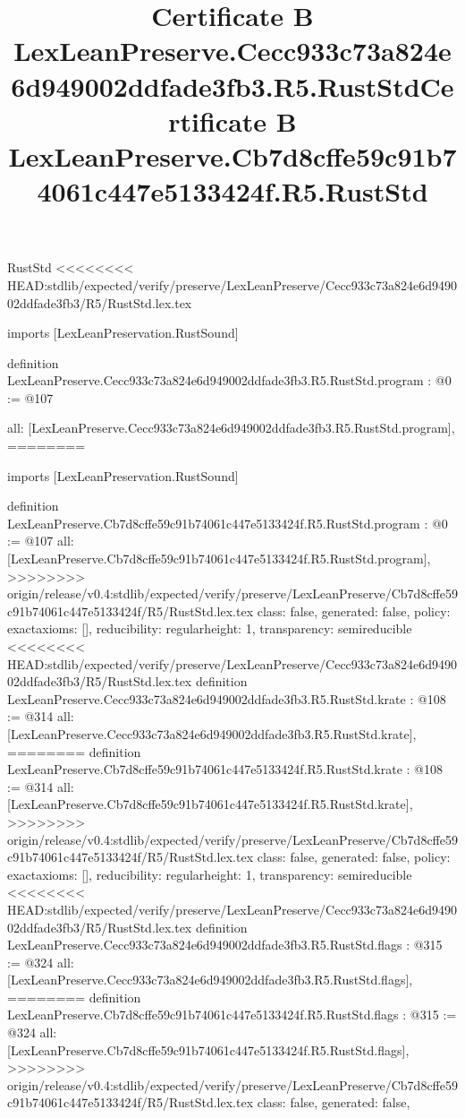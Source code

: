 \begin{lexlean}{RustStd}
<<<<<<<< HEAD:stdlib/expected/verify/preserve/LexLeanPreserve/Cecc933c73a824e6d949002ddfade3fb3/R5/RustStd.lex.tex
\title{Certificate B LexLeanPreserve.Cecc933c73a824e6d949002ddfade3fb3.R5.RustStd}
\begin{coremodule}
imports [LexLeanPreservation.RustSound]

definition LexLeanPreserve.Cecc933c73a824e6d949002ddfade3fb3.R5.RustStd.program : @0 := @107 {
  all: [LexLeanPreserve.Cecc933c73a824e6d949002ddfade3fb3.R5.RustStd.program],
========
\title{Certificate B LexLeanPreserve.Cb7d8cffe59c91b74061c447e5133424f.R5.RustStd}
\begin{coremodule}
imports [LexLeanPreservation.RustSound]

definition LexLeanPreserve.Cb7d8cffe59c91b74061c447e5133424f.R5.RustStd.program : @0 := @107 {
  all: [LexLeanPreserve.Cb7d8cffe59c91b74061c447e5133424f.R5.RustStd.program],
>>>>>>>> origin/release/v0.4:stdlib/expected/verify/preserve/LexLeanPreserve/Cb7d8cffe59c91b74061c447e5133424f/R5/RustStd.lex.tex
  class: false,
  generated: false,
  policy: exact{axioms: []},
  reducibility: regular{height: 1},
  transparency: semireducible
}
<<<<<<<< HEAD:stdlib/expected/verify/preserve/LexLeanPreserve/Cecc933c73a824e6d949002ddfade3fb3/R5/RustStd.lex.tex
definition LexLeanPreserve.Cecc933c73a824e6d949002ddfade3fb3.R5.RustStd.krate : @108 := @314 {
  all: [LexLeanPreserve.Cecc933c73a824e6d949002ddfade3fb3.R5.RustStd.krate],
========
definition LexLeanPreserve.Cb7d8cffe59c91b74061c447e5133424f.R5.RustStd.krate : @108 := @314 {
  all: [LexLeanPreserve.Cb7d8cffe59c91b74061c447e5133424f.R5.RustStd.krate],
>>>>>>>> origin/release/v0.4:stdlib/expected/verify/preserve/LexLeanPreserve/Cb7d8cffe59c91b74061c447e5133424f/R5/RustStd.lex.tex
  class: false,
  generated: false,
  policy: exact{axioms: []},
  reducibility: regular{height: 1},
  transparency: semireducible
}
<<<<<<<< HEAD:stdlib/expected/verify/preserve/LexLeanPreserve/Cecc933c73a824e6d949002ddfade3fb3/R5/RustStd.lex.tex
definition LexLeanPreserve.Cecc933c73a824e6d949002ddfade3fb3.R5.RustStd.flags : @315 := @324 {
  all: [LexLeanPreserve.Cecc933c73a824e6d949002ddfade3fb3.R5.RustStd.flags],
========
definition LexLeanPreserve.Cb7d8cffe59c91b74061c447e5133424f.R5.RustStd.flags : @315 := @324 {
  all: [LexLeanPreserve.Cb7d8cffe59c91b74061c447e5133424f.R5.RustStd.flags],
>>>>>>>> origin/release/v0.4:stdlib/expected/verify/preserve/LexLeanPreserve/Cb7d8cffe59c91b74061c447e5133424f/R5/RustStd.lex.tex
  class: false,
  generated: false,
}}}
\end{coremodule}}
\end{coremodule}
\end{lexlean}

